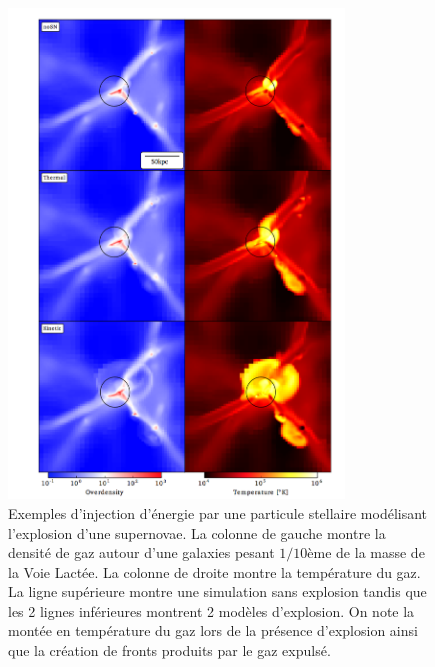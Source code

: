 \begin{figure}[htbp]
	\centering
		\includegraphics[height=13cm]{figs/SN.png}
	\caption[Exemples d'injection d'énergie par une particule stellaire modélisant l'explosion d'une supernovae. ]{Exemples d'injection d'énergie par une particule stellaire modélisant l'explosion d'une supernovae. La colonne de gauche montre la densité de gaz autour d'une galaxies pesant $1/10$ème de la masse de la Voie Lactée. La colonne de droite montre la température du gaz. La ligne supérieure montre une simulation sans explosion tandis que les 2 lignes inférieures montrent 2 modèles d'explosion. On note la montée en température du gaz lors de la présence d'explosion ainsi que la création de fronts produits par le gaz expulsé.}
	\label{f:SN}
\end{figure}


